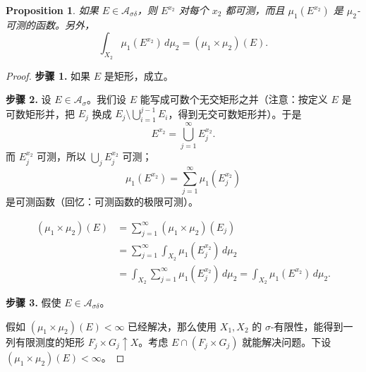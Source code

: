 \documentclass[12pt,letterpaper,twoside,openright]{ctexbook}
\theoremstyle{bluehead}
\newtheorem{proposition}[theorem]{Proposition}
\theoremstyle{olivehead}
\theoremstyle{orangehead}
\theoremstyle{redremark}
\begin{document}
\begin{proposition}
\label{prop:product-slices-sigma-delta}
如果 $E\in\mathcal{A}_{\sigma\delta}$，则 $E^{x_2}$ 对每个 $x_2$ 都可测，而且 $\mu_1(E^{x_2})$ 是 $\mu_2$-可测的函数。另外，
\[
  \int_{X_2}\mu_1(E^{x_2})\,d\mu_2=(\mu_1\times\mu_2)(E).
\]
\end{proposition}

\begin{proof}
\textbf{步骤 1.} 如果 $E$ 是矩形，成立。

\textbf{步骤 2.} 设 $E\in\mathcal{A}_\sigma$。我们设 $E$ 能写成可数个无交矩形之并（注意：按定义 $E$ 是可数矩形并，把 $E_j$ 换成 $E_j\setminus\bigcup_{i=1}^{j-1}E_i$，得到无交可数矩形并）。于是
\[
  E^{x_2}=\bigcup_{j=1}^{\infty}E_j^{x_2}.
\]
而 $E_j^{x_2}$ 可测，所以 $\bigcup_j E_j^{x_2}$ 可测；
\[
  \mu_1(E^{x_2})=\sum_{j=1}^{\infty}\mu_1(E_j^{x_2})
\]
是可测函数（回忆：可测函数的极限可测）。
\begin{center}
\end{center}
\[
\begin{aligned}
  (\mu_1\times\mu_2)(E)
  &=\sum_{j=1}^{\infty}(\mu_1\times\mu_2)(E_j)\\
  &=\sum_{j=1}^{\infty}\int_{X_2}\mu_1(E_j^{x_2})\,d\mu_2\\
  &=\int_{X_2}\sum_{j=1}^{\infty}\mu_1(E_j^{x_2})\,d\mu_2
  =\int_{X_2}\mu_1(E^{x_2})\,d\mu_2.
\end{aligned}
\]

\textbf{步骤 3.} 假使 $E\in\mathcal{A}_{\sigma\delta}$。

假如 $(\mu_1\times\mu_2)(E)<\infty$ 已经解决，那么使用 $X_1,X_2$ 的 $\sigma$-有限性，能得到一列有限测度的矩形 $F_j\times G_j\uparrow X$。考虑 $E\cap(F_j\times G_j)$ 就能解决问题。下设 $(\mu_1\times\mu_2)(E)<\infty$。


\end{proof}
\end{document}
